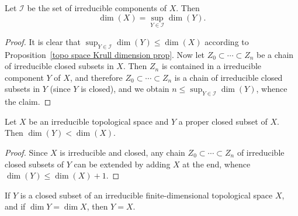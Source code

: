 \begin{proposition}
Let $\mathcal{I}$ be the set of irreducible components of $X$. Then
\[\dim(X)=\sup_{Y\in\mathcal{I}}\dim(Y).\]
\end{proposition}
\begin{proof}
It is clear that $\sup_{Y\in\mathcal{I}}\dim(Y)\leq\dim(X)$ according to Proposition~\ref{topo space Krull dimension prop}. Now let $Z_0\subset\cdots\subset Z_n$ be a chain of irreducible closed subsets in $X$. Then $Z_n$ is contained in a irreducible component $Y$ of $X$, and therefore $Z_0\subset\cdots\subset Z_n$ is a chain of irreducible closed subsets in $Y$ (since $Y$ is closed), and we obtain $n\leq\sup_{Y\in\mathcal{I}}\dim(Y)$, whence the claim.
\end{proof}
\begin{proposition}\label{topo space irreducible proper closed dimension small}
Let $X$ be an irreducible topological space and $Y$ a proper closed subset of $X$. Then $\dim(Y)<\dim(X)$.
\end{proposition}
\begin{proof}
Since $X$ is irreducible and closed, any chain $Z_0\subset\cdots\subset Z_n$ of irreducible closed subsets of $Y$ can be extended by adding $X$ at the end, whence $\dim(Y)\leq\dim(X)+1$.
\end{proof}
\begin{corollary}
If $Y$ is a closed subset of an irreducible finite-dimensional topological space $X$, and if $\dim Y=\dim X$, then $Y=X$.
\end{corollary}
